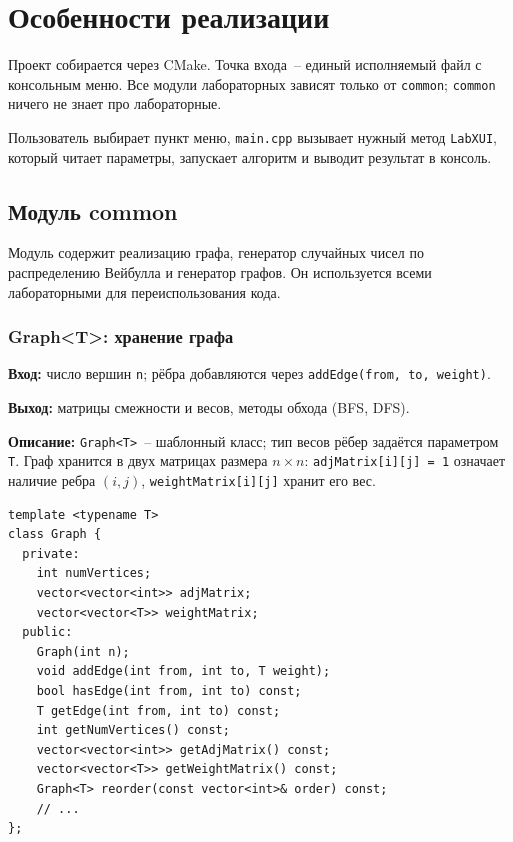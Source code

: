 \section{Особенности реализации}

Проект собирается через CMake. Точка входа~-- единый исполняемый файл
с консольным меню. Все модули лабораторных зависят только от \texttt{common};
\texttt{common} ничего не знает про лабораторные.

Пользователь выбирает пункт меню, \texttt{main.cpp} вызывает нужный метод
\texttt{LabXUI}, который читает параметры, запускает алгоритм и выводит
результат в консоль.

\subsection{Модуль common}

Модуль содержит реализацию графа, генератор случайных чисел по
распределению Вейбулла и генератор графов. Он используется всеми
лабораторными для переиспользования кода.

\subsubsection{Graph\textless T\textgreater: хранение графа}

\textbf{Вход:} число вершин \texttt{n}; рёбра добавляются через
\texttt{addEdge(from, to, weight)}.

\textbf{Выход:} матрицы смежности и весов, методы обхода (BFS, DFS).

\textbf{Описание:} \texttt{Graph<T>}~-- шаблонный класс; тип весов рёбер
задаётся параметром \texttt{T}. Граф хранится в двух матрицах размера
$n \times n$: \texttt{adjMatrix[i][j] = 1} означает наличие ребра $(i,j)$,
\texttt{weightMatrix[i][j]} хранит его вес.

\begin{lstlisting}[style=cstyle, caption={Объявление Graph (graph.h)}]
template <typename T>
class Graph {
  private:
    int numVertices;
    vector<vector<int>> adjMatrix;
    vector<vector<T>> weightMatrix;
  public:
    Graph(int n);
    void addEdge(int from, int to, T weight);
    bool hasEdge(int from, int to) const;
    T getEdge(int from, int to) const;
    int getNumVertices() const;
    vector<vector<int>> getAdjMatrix() const;
    vector<vector<T>> getWeightMatrix() const;
    Graph<T> reorder(const vector<int>& order) const;
    // ...
};
\end{lstlisting}


